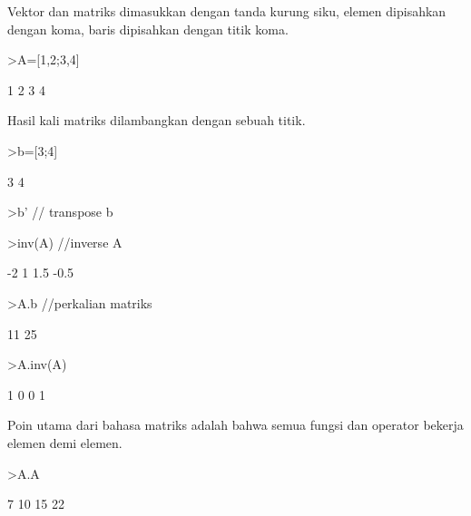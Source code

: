 \documentclass[a4paper,10pt]{article}
\begin{document}
\begin{eulernotebook}
\begin{eulercomment}
Vektor dan matriks dimasukkan dengan tanda kurung siku, elemen
dipisahkan dengan koma, baris dipisahkan dengan titik koma.
\end{eulercomment}
\begin{eulerprompt}
>A=[1,2;3,4]
\end{eulerprompt}
\begin{euleroutput}
              1             2 
              3             4 
\end{euleroutput}
\begin{eulercomment}
Hasil kali matriks dilambangkan dengan sebuah titik.
\end{eulercomment}
\begin{eulerprompt}
>b=[3;4]
\end{eulerprompt}
\begin{euleroutput}
              3 
              4 
\end{euleroutput}
\begin{eulerprompt}
>b' // transpose b
\end{eulerprompt}
\begin{euleroutput}
  [3,  4]
\end{euleroutput}
\begin{eulerprompt}
>inv(A) //inverse A
\end{eulerprompt}
\begin{euleroutput}
             -2             1 
            1.5          -0.5 
\end{euleroutput}
\begin{eulerprompt}
>A.b //perkalian matriks
\end{eulerprompt}
\begin{euleroutput}
             11 
             25 
\end{euleroutput}
\begin{eulerprompt}
>A.inv(A)
\end{eulerprompt}
\begin{euleroutput}
              1             0 
              0             1 
\end{euleroutput}
\begin{eulercomment}
Poin utama dari bahasa matriks adalah bahwa semua fungsi dan operator
bekerja elemen demi elemen.
\end{eulercomment}
\begin{eulerprompt}
>A.A
\end{eulerprompt}
\begin{euleroutput}
              7            10 
             15            22 
\end{euleroutput}

\end{eulernotebook}
\end{document}
